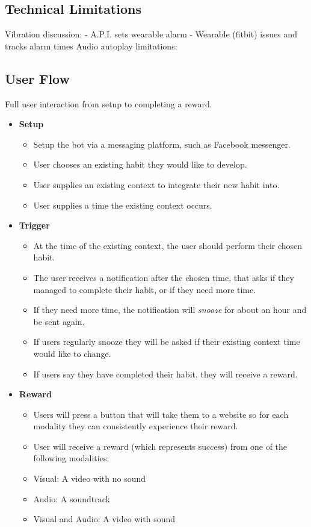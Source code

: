 \subsection{Technical Limitations}
Vibration discussion: - A.P.I. sets wearable alarm - Wearable (fitbit) issues and tracks alarm times
Audio autoplay limitations:

\subsection{User Flow}

Full user interaction from setup to completing a reward.

\begin{itemize}
  \item \textbf{Setup}
  \begin{itemize}
    \item Setup the bot via a messaging platform, such as Facebook messenger.
    \item User chooses an existing habit they would like to develop.
    \item User supplies an existing context to integrate their new habit into.
    \item User supplies a time the existing context occurs.
  \end{itemize}
  \item \textbf{Trigger}
  \begin{itemize}
    \item At the time of the existing context, the user should perform their chosen habit.
    \item The user receives a notification after the chosen time, that asks if they managed to complete their habit, or if they need more time.
    \item If they need more time, the notification will \textit{snooze} for about an hour and be sent again.
    \item If users regularly snooze they will be asked if their existing context time would like to change.
    \item If users say they have completed their habit, they will receive a reward.
  \end{itemize}
  \item \textbf{Reward}
  \begin{itemize}
    \item Users will press a button that will take them to a website so for each modality they can consistently experience their reward.
    \item User will receive a reward (which represents success) from one of the following modalities:
    \item Visual: A video with no sound
    \item Audio: A soundtrack
    \item Visual and Audio: A video with sound
  \end{itemize}
\end{itemize}

